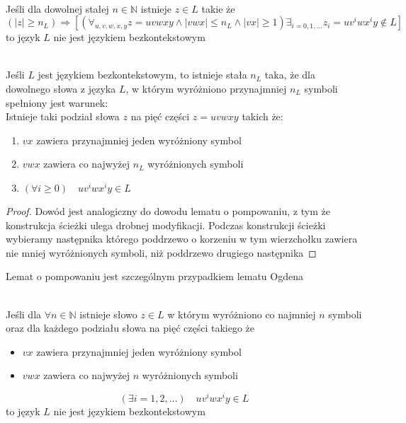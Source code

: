 	\begin{lemat}~\\
		Jeśli dla dowolnej stałej $n\in\mathbb{N}$ istnieje $z\in L$ takie że
		$$
			(|z| \geqslant n_L) \Rightarrow [( \forall_{u,v,w,x,y} z = uvwxy \wedge |vwx| \leqslant n_L \wedge |vx| \geqslant 1) \exists_{i=0,1,\dots} z_i = uv^iwx^iy \not\in L]
		$$
		to język $L$ nie jest językiem bezkontekstowym
	\end{lemat}			
		
	\begin{lemat}~\\
		Jeśli $L$ jest językiem bezkontekstowym, to istnieje stała $n_L$ taka, że dla dowolnego słowa z języka $L$, w którym wyróżniono przynajmniej
		$n_L$ symboli spełniony jest warunek:\\
		Istnieje taki podział słowa $z$ na pięć części $z = uvwxy$ takich że:
		\begin{enumerate}
			\item $vx$ zawiera przynajmniej jeden wyróżniony symbol
			\item $vwx$ zawiera co najwyżej $n_L$ wyróżnionych symboli
			\item $(\forall i\geqslant 0) \quad uv^iwx^iy \in L$
		\end{enumerate}
		
		\begin{proof}
			Dowód jest analogiczny do dowodu lematu o pompowaniu, z tym że konstrukcja ścieżki ulega drobnej modyfikacji.
			Podczas konstrukcji ścieżki wybieramy następnika którego poddrzewo o korzeniu w tym wierzchołku zawiera nie
			mniej wyróżnionych symboli, niż poddrzewo drugiego następnika
		\end{proof}			
		
		\begin{uwaga}
			Lemat o pompowaniu jest szczególnym przypadkiem lematu Ogdena
		\end{uwaga}
	\end{lemat}	
	
	\begin{lemat}~\\
		Jeśli dla $\forall n\in \mathbb{N}$ istnieje słowo $z \in L$ w którym wyróżniono co najmniej $n$ symboli oraz
		dla każdego podziału słowa na pięć części takiego że
		\begin{itemize}
			\item $vx$ zawiera przynajmniej jeden wyróżniony symbol
			\item $vwx$ zawiera co najwyżej $n$ wyróżnionych symboli
		\end{itemize}
		$$
		(\exists i=1,2,\dots) \quad uv^iwx^iy \in L
		$$
		to język $L$ nie jest językiem bezkontekstowym
	\end{lemat}			
		
